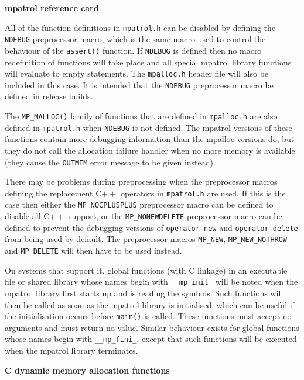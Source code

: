 \documentclass[a4paper,landscape,final]{article}
\newcommand{\heading}[1]{\textbf{\normalsize #1}}
\newcommand{\function}[1]{\texttt{#1()}}
\newcommand{\error}[1]{\texttt{#1}}
\begin{document}
\begin{multicols}{3}{\textbf{\Large mpatrol reference card}}
\vskip 12pt

All of the function definitions in \texttt{mpatrol.h} can be disabled by
defining the \texttt{NDEBUG} preprocessor macro, which is the same macro used
to control the behaviour of the \function{assert} function.  If \texttt{NDEBUG}
is defined then no macro redefinition of functions will take place and all
special mpatrol library functions will evaluate to empty statements.  The
\texttt{mpalloc.h} header file will also be included in this case.  It is
intended that the \texttt{NDEBUG} preprocessor macro be defined in release
builds.

The \function{MP\_MALLOC} family of functions that are defined in
\texttt{mpalloc.h} are also defined in \texttt{mpatrol.h} when \texttt{NDEBUG}
is not defined.  The mpatrol versions of these functions contain more debugging
information than the mpalloc versions do, but they do not call the allocation
failure handler when no more memory is available (they cause the \error{OUTMEM}
error message to be given instead).

There may be problems during preprocessing when the preprocessor macros defining
the replacement C$++$ operators in \texttt{mpatrol.h} are used.  If this is the
case then either the \texttt{MP\_NOCPLUSPLUS} preprocessor macro can be defined
to disable all C$++$ support, or the \texttt{MP\_NONEWDELETE} preprocessor macro
can be defined to prevent the debugging versions of \texttt{operator new} and
\texttt{operator delete} from being used by default.  The preprocessor macros
\texttt{MP\_NEW}, \texttt{MP\_NEW\_NOTHROW} and \texttt{MP\_DELETE} will then
have to be used instead.

On systems that support it, global functions (with C linkage) in an executable
file or shared library whose names begin with \texttt{\_\_mp\_init\_} will be
noted when the mpatrol library first starts up and is reading the symbols.  Such
functions will then be called as soon as the mpatrol library is initialised,
which can be useful if the initialisation occurs before \function{main} is
called.  These functions must accept no arguments and must return no value.
Similar behaviour exists for global functions whose names begin with
\texttt{\_\_mp\_fini\_}, except that such functions will be executed when the
mpatrol library terminates.

\vskip 12pt
\heading{C dynamic memory allocation functions}
\vskip 6pt


\end{multicols}
\end{document}

